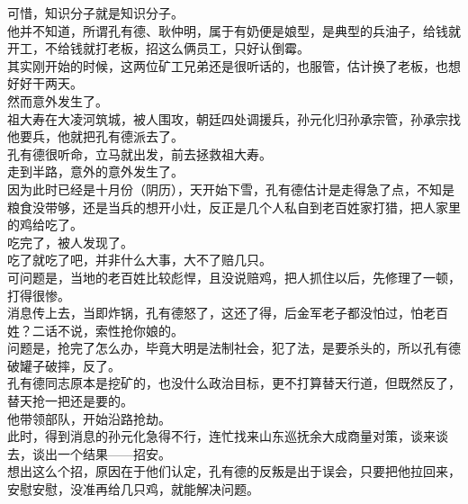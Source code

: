 \begin{multicols}{\theparacolNo}
可惜，知识分子就是知识分子。\\

他并不知道，所谓孔有德、耿仲明，属于有奶便是娘型，是典型的兵油子，给钱就开工，不给钱就打老板，招这么俩员工，只好认倒霉。\\

其实刚开始的时候，这两位矿工兄弟还是很听话的，也服管，估计换了老板，也想好好干两天。\\

然而意外发生了。\\

祖大寿在大凌河筑城，被人围攻，朝廷四处调援兵，孙元化归孙承宗管，孙承宗找他要兵，他就把孔有德派去了。\\

孔有德很听命，立马就出发，前去拯救祖大寿。\\

走到半路，意外的意外发生了。\\

因为此时已经是十月份（阴历），天开始下雪，孔有德估计是走得急了点，不知是粮食没带够，还是当兵的想开小灶，反正是几个人私自到老百姓家打猎，把人家里的鸡给吃了。\\

吃完了，被人发现了。\\

吃了就吃了吧，并非什么大事，大不了赔几只。\\

可问题是，当地的老百姓比较彪悍，且没说赔鸡，把人抓住以后，先修理了一顿，打得很惨。\\

消息传上去，当即炸锅，孔有德怒了，这还了得，后金军老子都没怕过，怕老百姓？二话不说，索性抢你娘的。\\

问题是，抢完了怎么办，毕竟大明是法制社会，犯了法，是要杀头的，所以孔有德破罐子破摔，反了。\\

孔有德同志原本是挖矿的，也没什么政治目标，更不打算替天行道，但既然反了，替天抢一把还是要的。\\

他带领部队，开始沿路抢劫。\\

此时，得到消息的孙元化急得不行，连忙找来山东巡抚余大成商量对策，谈来谈去，谈出一个结果——招安。\\

想出这么个招，原因在于他们认定，孔有德的反叛是出于误会，只要把他拉回来，安慰安慰，没准再给几只鸡，就能解决问题。\\


\end{multicols}
